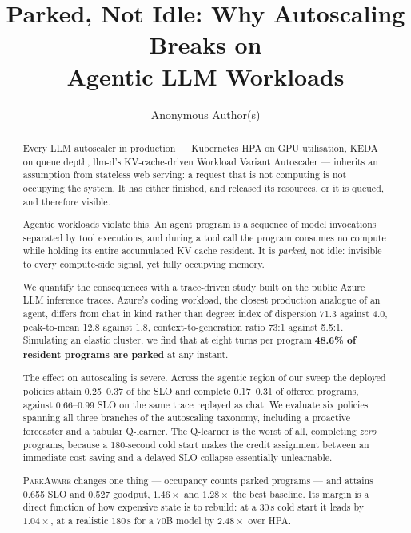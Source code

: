 \documentclass[sigconf,nonacm]{acmart}
\newcommand{\sys}{\textsc{ParkAware}\xspace}
\begin{document}
\title{Parked, Not Idle: Why Autoscaling Breaks on\\Agentic LLM Workloads}
\author{Anonymous Author(s)}

\begin{abstract}
Every LLM autoscaler in production --- Kubernetes HPA on GPU utilisation,
KEDA on queue depth, llm-d's KV-cache-driven Workload Variant Autoscaler
--- inherits an assumption from stateless web serving: a request that is
not computing is not occupying the system. It has either finished, and
released its resources, or it is queued, and therefore visible.

Agentic workloads violate this. An agent program is a sequence of model
invocations separated by tool executions, and during a tool call the
program consumes no compute while holding its entire accumulated KV cache
resident. It is \emph{parked}, not idle: invisible to every compute-side
signal, yet fully occupying memory.

We quantify the consequences with a trace-driven study built on the public
Azure LLM inference traces. Azure's coding workload, the closest
production analogue of an agent, differs from chat in kind rather than
degree: index of dispersion 71.3 against 4.0, peak-to-mean 12.8 against
1.8, context-to-generation ratio 73:1 against 5.5:1. Simulating an elastic
cluster, we find that at eight turns per program \textbf{48.6\% of
resident programs are parked} at any instant.

The effect on autoscaling is severe. Across the agentic region of our
sweep the deployed policies attain 0.25--0.37 of the SLO and complete
0.17--0.31 of offered programs, against 0.66--0.99 SLO on the same trace
replayed as chat. We evaluate six policies spanning all three branches of
the autoscaling taxonomy, including a proactive forecaster and a tabular
Q-learner. The Q-learner is the worst of all, completing \emph{zero}
programs, because a 180-second cold start makes the credit assignment
between an immediate cost saving and a delayed SLO collapse essentially
unlearnable.

\sys changes one thing --- occupancy counts parked programs --- and
attains 0.655 SLO and 0.527 goodput, $1.46\times$ and $1.28\times$ the
best baseline. Its margin is a direct function of how expensive state is
to rebuild: at a 30\,s cold start it leads by $1.04\times$, at a realistic
180\,s for a 70B model by $2.48\times$ over HPA.
\end{abstract}
\end{document}
